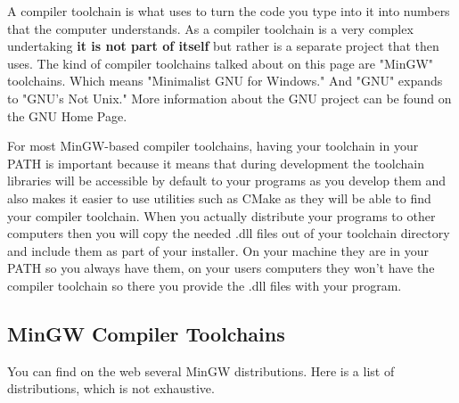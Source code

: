 A compiler toolchain is what \codeblocks uses to turn the code you type into it into numbers that the computer understands. As a compiler toolchain is a very complex undertaking \textbf{it is not part of \codeblocks itself} but rather is a separate project that \codeblocks then uses. The kind of compiler toolchains talked about on this page are "MinGW" toolchains. Which means "Minimalist GNU for Windows." And "GNU" expands to "GNU's Not Unix." More information about the GNU project can be found on the GNU Home Page.

For most MinGW-based compiler toolchains, having your toolchain in your PATH is important because it means that during development the toolchain libraries will be accessible by default to your programs as you develop them and also makes it easier to use utilities such as CMake as they will be able to find your compiler toolchain. When you actually distribute your programs to other computers then you will copy the needed .dll files out of your toolchain directory and include them as part of your installer. On your machine they are in your PATH so you always have them, on your users computers they won't have the compiler toolchain so there you provide the .dll files with your program. 

\subsection{MinGW Compiler Toolchains}\label{sec:install_toolchains}

You can find on the web several MinGW distributions. Here is a list of distributions, which is not exhaustive.

